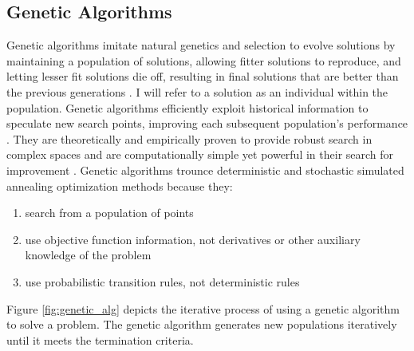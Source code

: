 \subsection{Genetic Algorithms}
\label{sec:genetic_alg}
Genetic algorithms imitate natural genetics and selection to evolve solutions 
by maintaining a population of solutions, allowing fitter solutions to reproduce,
and letting lesser fit solutions die off, resulting in final solutions that are 
better than the previous generations \cite{renner_genetic_2003}. 
I will refer to a solution as an individual within the population. 
Genetic algorithms efficiently exploit historical information to speculate new
 search points, improving each subsequent population's performance 
\cite{goldberg_genetic_1989}. 
They are theoretically and empirically proven to provide robust 
search in complex spaces and are computationally simple yet powerful 
in their search for improvement \cite{goldberg_genetic_1989}. 
Genetic algorithms trounce deterministic and stochastic simulated 
annealing optimization methods because they:
\begin{enumerate}
    \item search from a population of points
    \item use objective function information, not derivatives or other 
    auxiliary knowledge of the problem
    \item use probabilistic transition rules, not deterministic rules
\end{enumerate}
Figure \ref{fig:genetic_alg} depicts the iterative process of using a genetic algorithm
to solve a problem. 
The genetic algorithm generates new populations iteratively until it meets the termination 
criteria. 
